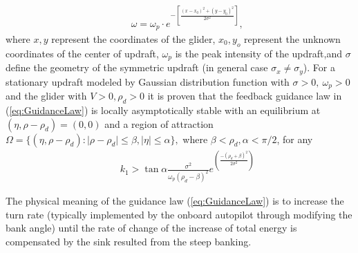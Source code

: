 \documentclass{ifacconf}
\begin{document}
\begin{eqnarray}
    && \omega=\omega_p \cdot e^{-[\frac{(x-x_0)^2+(y-y_0)^2}{2\sigma^2}]},
    \label{eq:GaussUpdraft}
\end{eqnarray}
where $x, y$ represent the coordinates of the glider, $x_0, y_o$ represent the unknown coordinates of the center of updraft, $\omega_p$ is the peak intensity of the updraft,and $\sigma$ define the geometry of the symmetric updraft (in general case $\sigma_x \neq \sigma_y$). For a stationary updraft modeled by Gaussian distribution function with $\sigma>0,~\omega_p>0$ and the glider with $V>0, \rho_d>0$ it is proven that the feedback guidance law in (\ref{eq:GuidanceLaw}) is locally asymptotically stable with an equilibrium at $(\eta, \rho-\rho_d)=(0,0)$ and a region of attraction $\Omega=\{(\eta, \rho-\rho_d): \vert \rho-\rho_d \vert \leq \beta,  \vert \eta \vert \leq \alpha \}, $ where $\beta < \rho_d, \alpha< \pi/2$, for any
\begin{eqnarray}
    && k_1 > \tan \alpha \frac{\sigma^2}{\omega_p(\rho_d-\beta)^2} e^(\frac{-(\rho_d+\beta)^2}{2\sigma^2} )\nonumber
    \label{eq:GuidanceGain}
\end{eqnarray}

The physical meaning of the guidance law (\ref{eq:GuidanceLaw}) is to increase the turn rate (typically implemented by the onboard autopilot through modifying the bank angle) until the rate of change of the increase of total energy is compensated by the sink resulted from the steep banking.

\end{document}
